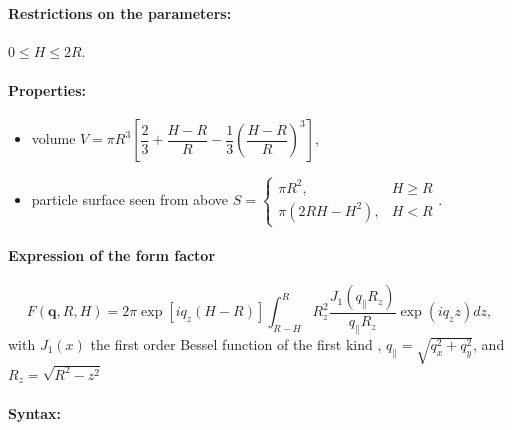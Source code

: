 \paragraph{Restrictions on the parameters:} $0 \leq H\leq 2R$.

\paragraph{Properties:}
\begin{itemize}
\item volume $V=\pi R^3 \left[\dfrac{2}{3} + \dfrac{H-R}{R} - \dfrac{1}{3}\left(\dfrac{H-R}{R}\right)^3\right]$,
\item particle surface seen from above $S = \left\{\begin{array}{ll} \pi R^2, & H \geq R \\
         \pi\left(2RH-H^2\right), & H < R \end{array}\right. $.
\end{itemize}

\paragraph{Expression of the form factor}
\begin{equation*}  
F(\mathbf{q},R, H)= 2\pi \exp[i q_z (H-R)]\int_{R-H} ^{R} R_z^2 \frac{J_1(q_{\parallel} R_z) }{q_{\parallel} R_z} \exp(i q_z z) dz,
\end{equation*}
with $J_1(x)$ the first order
Bessel function of the first kind \cite{AbSt64}, $q_{\parallel} =
\sqrt{q_x^2+q_y^2}$, and $R_z = \sqrt{R^2-z^2}$

\paragraph{Syntax:} 


